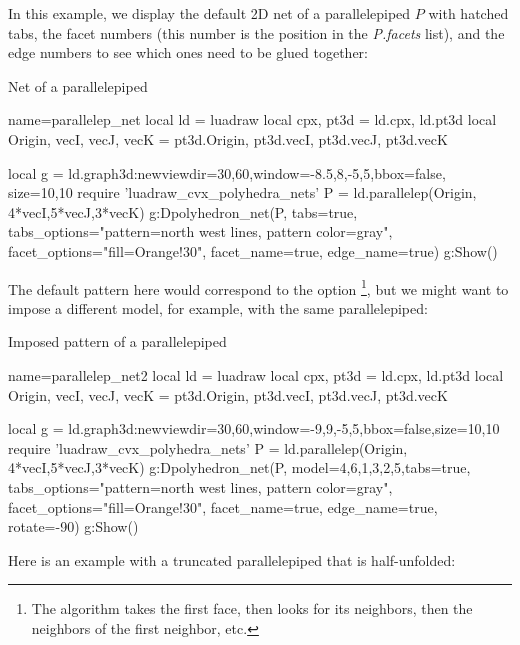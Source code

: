 In this example, we display the default 2D net of a parallelepiped $P$ with hatched tabs, the facet numbers (this number is the position in the \emph{P.facets} list), and the edge numbers to see which ones need to be glued together:

\begin{demo}{Net of a parallelepiped}
\begin{luadraw}{name=parallelep_net}
local ld = luadraw
local cpx, pt3d = ld.cpx, ld.pt3d
local Origin, vecI, vecJ, vecK = pt3d.Origin, pt3d.vecI, pt3d.vecJ, pt3d.vecK

local g = ld.graph3d:new{viewdir={30,60},window={-8.5,8,-5,5},bbox=false, size={10,10}}
require 'luadraw_cvx_polyhedra_nets'
P = ld.parallelep(Origin, 4*vecI,5*vecJ,3*vecK)
g:Dpolyhedron_net(P, {tabs=true, tabs_options="pattern=north west lines, pattern color=gray",
  facet_options="fill=Orange!30", facet_name=true, edge_name=true})
g:Show()
\end{luadraw}
\end{demo}

The default pattern here would correspond to the option \footnote{The algorithm takes the first face, then looks for its neighbors, then the neighbors of the first neighbor, etc.}, but we might want to impose a different model, for example, with the same parallelepiped:

\begin{demo}{Imposed pattern of a parallelepiped}
\begin{luadraw}{name=parallelep_net2}
local ld = luadraw
local cpx, pt3d = ld.cpx, ld.pt3d
local Origin, vecI, vecJ, vecK = pt3d.Origin, pt3d.vecI, pt3d.vecJ, pt3d.vecK

local g = ld.graph3d:new{viewdir={30,60},window={-9,9,-5,5},bbox=false,size={10,10}}
require 'luadraw_cvx_polyhedra_nets'
P = ld.parallelep(Origin, 4*vecI,5*vecJ,3*vecK)
g:Dpolyhedron_net(P, {model={{4,6,1,3,2,5}},tabs=true, 
  tabs_options="pattern=north west lines, pattern color=gray", 
  facet_options="fill=Orange!30", facet_name=true, 
 edge_name=true, rotate=-90})
g:Show()
\end{luadraw}
\end{demo}

Here is an example with a truncated parallelepiped that is half-unfolded:

